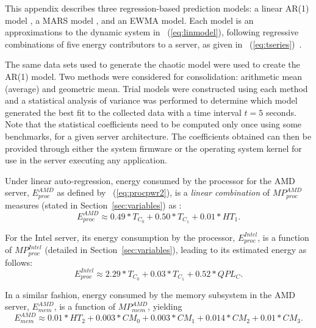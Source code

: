 %
%
This appendix describes three regression-based prediction models: a linear
AR(1) model \cite{Box1994}, a MARS model \cite{Friedman1991}, and an
EWMA model. 
Each model is an  approximations to the dynamic system in
\equationname~(\ref{eq:linmodel}), following regressive combinations of
five energy contributors to a server, as given in 
\equationname~(\ref{eq:tseries})~\cite{Lewis2008}.

The same data sets used to generate the chaotic model were used to
create the AR(1) model. Two methods were considered for consolidation:
arithmetic mean (average) and geometric mean.  Trial models were
constructed using each method and a statistical analysis of variance was
performed to determine which model generated the best fit to the
collected data with a time interval $t=5$ seconds.  Note that the statistical coefficients need to be computed
only once using some benchmarks, for a given server architecture.
The coefficients obtained can then be provided through either
the system firmware or the operating system kernel for use in the server
executing any application.

Under linear auto-regression, energy consumed by the processor for the
AMD server, $E_{proc}^{AMD}$ as defined by
\equationname~(\ref{eq:procpwr2}), is a \textit{linear combination} of
$MP_{proc}^{AMD}$ measures (stated in Section~\ref{sec:variables}) as \cite{Lewis2008}:
\begin{equation*}
  \label{eq:apxproc}
  E_{proc}^{AMD} \approx 0.49*T_{C_{0}}+0.50*T_{C_{1}}+0.01*HT_{1}. 
\end{equation*}

For the Intel server, its energy consumption by the processor,
$E_{proc}^{Intel}$, is a function of $MP_{proc}^{Intel}$ (detailed in
Section~\ref{sec:variables}), leading to its estimated energy as follows:
\begin{equation*}
  \label{eq:apxpr}
  E_{proc}^{Intel} \approx 2.29*T_{C_{0}}+0.03*T_{C_{1}}+0.52*QPL_{C}.
\end{equation*}
 
In a similar fashion, energy consumed by the memory subsystem in the AMD server,
$E_{mem}^{AMD}$, is a function of $MP_{mem}^{AMD}$, yielding
\begin{equation*}
  \label{eq:apxmem}
  E_{mem}^{AMD} \approx 0.01*HT_{2}+0.003*CM_{0}+0.003*CM_{1}+0.014*CM_{2}+0.01*CM_{3}.
\end{equation*}

